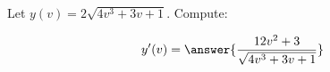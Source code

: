 \documentclass{ximera}
\begin{document}
\begin{exercise}
Let $y(v) = 2 \sqrt{4v^3+3v+1}$. Compute:

\[
y'(v) =\answer{ \frac{12v^2+3}{\sqrt{4v^3+3v+1}} }
\]
\end{exercise}
\end{document}
